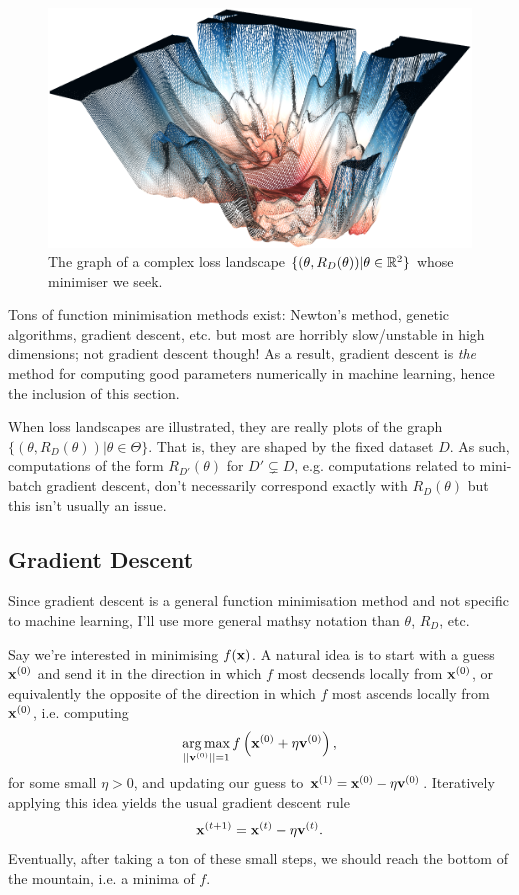 \documentclass[11pt]{article}
\begin{document}
\begin{figure}[t]
    \centering
    \includegraphics[width=0.75\columnwidth]{./figures/gradient_descent/loss_landscape.png}
    \caption{The graph of a complex loss landscape $\{(\theta,R_D(\theta))|\theta\in\mathbb{R}^2\}$ whose minimiser we seek. }
    \label{fig:loss_landscape_complex}
\end{figure}

Tons of function minimisation methods exist: Newton's method, genetic algorithms, gradient descent, etc. but most are horribly slow/unstable in high dimensions; not gradient descent though! As a result, gradient descent is \textit{the} method for computing good parameters numerically in machine learning, hence the inclusion of this section.

\begin{tcolorbox}[title={\centering\textbf{Loss landscapes are dataset-dependent!}}, colback=myLightBlue, colbacktitle=myDarkBlue, colframe=myDarkBlue, coltitle=white]
    When loss landscapes are illustrated, they are really plots of the graph $\{(\theta, R_D(\theta))|\theta\in\Theta\}$. That is, they are shaped by the fixed dataset $D$. As such, computations of the form $R_{D'}(\theta)$ for $D'\subsetneq D$, e.g. computations related to mini-batch gradient descent, don't necessarily correspond exactly with $R_D(\theta)$ but this isn't usually an issue.
\end{tcolorbox}

\subsection{Gradient Descent}
Since gradient descent is a general function minimisation method and not specific to machine learning, I'll use more general mathsy notation than $\theta$, $R_D$, etc.

Say we're interested in minimising $f(\mathbf{x})$. A natural idea is to start with a guess $\mathbf{x}^{(0)}$ and send it in the direction in which $f$ most decsends locally from $\mathbf{x}^{(0)}$, or equivalently the opposite of the direction in which $f$ most ascends locally from $\mathbf{x}^{(0)}$, i.e. computing
$$
\operatorname*{arg\,max}_{||\mathbf{v}^{(0)}||=1}f\left(\mathbf{x}^{(0)}+\eta\mathbf{v}^{(0)}\right),
$$
for some small $\eta>0$, and updating our guess to $\mathbf{x}^{(1)}=\mathbf{x}^{(0)}-\eta\mathbf{v}^{(0)}$. Iteratively applying this idea yields the usual gradient descent rule
$$
\mathbf{x}^{(t+1)}
=
\mathbf{x}^{(t)}-\eta\mathbf{v}^{(t)}.
$$
Eventually, after taking a ton of these small steps, we should reach the bottom of the mountain, i.e. a minima of $f$.
\end{document}
